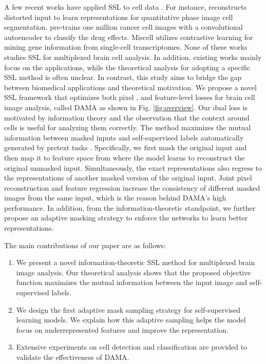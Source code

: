 \documentclass[10pt,twocolumn,letterpaper]{article}
\begin{document}
A few recent works have applied SSL to cell data \cite{cell1,cell2,cell3}. For instance, \cite{cell2} reconstructs distorted input to learn representations for quantitative phase image cell segmentation. \cite{cell1} pre-trains one million cancer cell images with a convolutional autoencoder to classify the drug effects. Miscell \cite{cell3} utilizes contrastive learning for mining gene information from single-cell transcriptomes. None of these works studies SSL for multiplexed brain cell analysis. In addition, existing works mainly focus on the applications, while the theoretical analysis for adopting a specific SSL method is often unclear. In contrast, this study aims to bridge the gap between biomedical applications and theoretical motivation. We propose a novel SSL framework that optimizes both pixel \cite{mae,beit,simmim}, and feature-level losses \cite{data2vec,completer,morency} for brain cell image analysis, called DAMA as shown in Fig. \ref{fig:overview}. Our dual loss is motivated by information theory and the observation that the context around cells is useful for analyzing them correctly. The method maximizes the mutual information between masked inputs and self-supervised labels automatically generated by pretext tasks \cite{mae,beit,data2vec}. Specifically, we first mask the original input and then map it to feature space from where the model learns to reconstruct the original unmasked input. Simultaneously, the exact representations also regress to the representations of another masked version of the original input. Joint pixel reconstruction and feature regression increase the consistency of different masked images from the same input, which is the reason behind DAMA's high performance. In addition, from the information-theoretic standpoint, we further propose an adaptive masking strategy to enforce the networks to learn better representations.

The main contributions of our paper are as follows:
\begin{enumerate}
\item We present a novel information-theoretic SSL method for multiplexed brain image analysis. Our theoretical analysis shows that the proposed objective function maximizes the mutual information between the input image and self-supervised labels. 
\item We design the first adaptive mask sampling strategy for self-supervised learning models. We explain how this adaptive sampling helps the model focus on underrepresented features and improve the representation.
\item Extensive experiments on cell detection and classification are provided to validate the effectiveness of DAMA. 
\end{enumerate}
\end{document}
